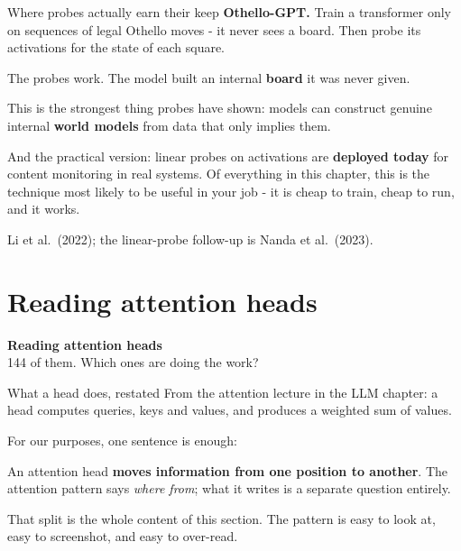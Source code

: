 \documentclass[aspectratio=169]{beamer}
\newcommand{\keybox}[1]{%
  \begin{tcolorbox}[colback=armblue!8, colframe=armblue, boxrule=0.6pt, arc=2pt]
  #1
  \end{tcolorbox}}
\newcommand{\sectiontransition}[2]{%
  \begin{frame}[plain]
    \vfill
    \begin{center}
      {\Huge\bfseries\color{popblue} #1}\\[1.1em]
      {\large #2}
    \end{center}
    \vfill
  \end{frame}}
\begin{document}
\begin{frame}{Where probes actually earn their keep}
  \vspace{0.6em}
  \textbf{Othello-GPT.} Train a transformer only on sequences of legal Othello moves - it never
  sees a board. Then probe its activations for the state of each square.

  \vspace{0.5em}
  The probes work. The model built an internal \textbf{board} it was never given.

  \vspace{0.9em}
  \keybox{This is the strongest thing probes have shown: models can construct genuine internal
  \textbf{world models} from data that only implies them.}

  \vspace{0.8em}
  And the practical version: linear probes on activations are \textbf{deployed today} for
  content monitoring in real systems. Of everything in this chapter, this is the
  technique most likely to be useful in your job - it is cheap to train, cheap to run, and it
  works.

  \vspace{0.5em}
  {\footnotesize Li et al.\ (2022); the linear-probe follow-up is Nanda et al.\ (2023).}
\end{frame}

\section{Reading attention heads}
\sectiontransition{Reading attention heads}{144 of them. Which ones are doing the work?}

\begin{frame}{What a head does, restated}
  \vspace{0.7em}
  From the attention lecture in the LLM chapter: a head computes queries, keys and values, and
  produces a weighted sum of values.

  \vspace{0.6em}
  For our purposes, one sentence is enough:

  \vspace{0.6em}
  \keybox{An attention head \textbf{moves information from one position to another}. The
  attention pattern says \emph{where from}; what it writes is a separate question entirely.}

  \vspace{0.9em}
  That split is the whole content of this section. The pattern is easy to look at, easy to
  screenshot, and easy to over-read.
\end{frame}
\end{document}
